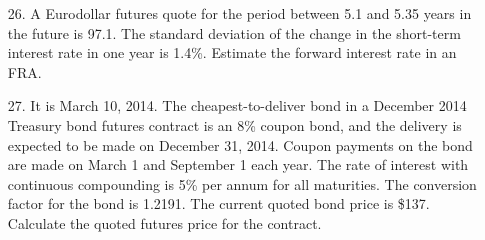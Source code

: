 \documentclass{article}
\begin{document}
\begin{itemize}
	\item[26.] A Eurodollar futures quote for the period between 5.1 and 5.35 years in the future is 97.1. The standard deviation of the change in the short-term interest rate in one year is 1.4\%. Estimate the forward interest rate in an FRA.
		
	\item[27.] It is March 10, 2014. The cheapest-to-deliver bond in a December 2014 Treasury bond futures contract is an 8\% coupon bond, and the delivery is expected to be made on December 31, 2014. Coupon payments on the bond are made on March 1 and September 1 each year. The rate of interest with continuous compounding is 5\% per annum for all maturities. The conversion factor for the bond is 1.2191. The current quoted bond price is \$137. Calculate the quoted futures price for the contract.
		
\end{itemize}
\end{document}

